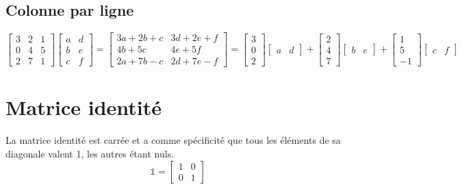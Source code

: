 \documentclass[a4paper]{book}
\begin{document}
\subsection{Colonne par ligne}
\begin{equation}
    \begin{bmatrix}
    3&2&1 \\
    0&4&5\\
    2&7&1
    \end{bmatrix} 
    \begin{bmatrix}
    a&d\\
    b&e\\
    c&f
    \end{bmatrix} =
    \begin{bmatrix}
    3a+2b+c&3d+2e+f \\
    4b+5c&4e+5f\\
    2a+7b-c&2d+7e-f
    \end{bmatrix} =
    \begin{bmatrix}
    3\\0\\2  
    \end{bmatrix}
    \begin{bmatrix}
    a&d
    \end{bmatrix}+
    \begin{bmatrix}
    2\\4\\7
    \end{bmatrix}
    \begin{bmatrix}
    b&e
    \end{bmatrix}+
    \begin{bmatrix}
    1\\5\\-1
    \end{bmatrix}
    \begin{bmatrix}
    c&f
    \end{bmatrix}
\end{equation}
\section{Matrice identité}
La matrice identité est carrée et a comme spécificité que tous les éléments de sa diagonale valent 1, les autres étant nuls.
\begin{equation}
    \mathbb{1} = 
    \begin{bmatrix}
    1&0 \\
    0&1
    \end{bmatrix}
\end{equation}
\end{document}
